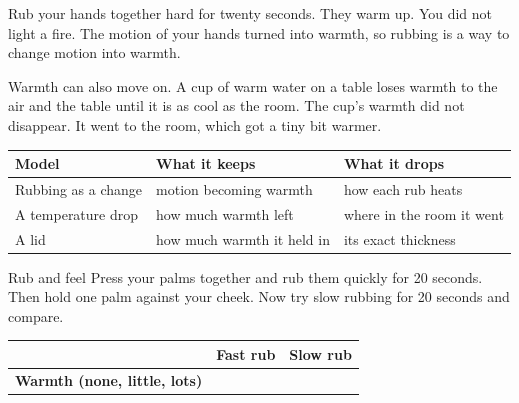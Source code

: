 \label{ch3}

Rub your hands together hard for twenty seconds. They warm up. You did not light a fire. The motion of your hands turned into warmth, so rubbing is a way to change motion into warmth.

Warmth can also move on. A cup of warm water on a table loses warmth to the air and the table until it is as cool as the room. The cup's warmth did not disappear. It went to the room, which got a tiny bit warmer.

\begin{center}
\sffamily\small\renewcommand{\arraystretch}{1.5}
\begin{tabular}{@{}p{3.4cm}p{3.7cm}p{3.7cm}@{}}
\toprule
\textbf{Model} & \textbf{What it keeps} & \textbf{What it drops}\\
\midrule
Rubbing as a change & motion becoming warmth & how each rub heats\\
A temperature drop & how much warmth left & where in the room it went\\
A lid & how much warmth it held in & its exact thickness\\
\bottomrule
\end{tabular}
\end{center}

\begin{tryit}{Rub and feel}
Press your palms together and rub them quickly for 20 seconds. Then hold one palm against your cheek. Now try slow rubbing for 20 seconds and compare.\par\medskip
\renewcommand{\arraystretch}{1.6}
\begin{tabular}{|l|c|c|}
\hline
 & \textbf{Fast rub} & \textbf{Slow rub}\\ \hline
\textbf{Warmth (none, little, lots)} & & \\ \hline
\end{tabular}
\end{tryit}

